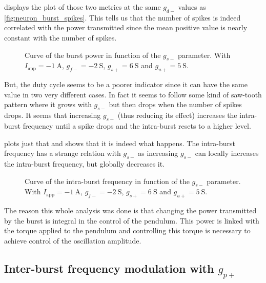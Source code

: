  displays the plot of those two metrics at the same $g_{d-}$ values as \cref{fig:neuron_burst_spikes}.
This tells us that the number of spikes is indeed correlated with the power transmitted since the mean positive value is nearly constant with the number of spikes. 

\begin{figure}[!htb]
    \centering
    \caption{Curve of the burst power in function of the $g_{s-}$ parameter. With $I_\text{app} = \qty{-1}{\ampere}$, $g_{f-} = \qty{-2}{\siemens}$, $g_{s+} = \qty{6}{\siemens}$ and $g_{u+} = \qty{5}{\siemens}$.}
    \label{fig:neuron_burst_power}
\end{figure}

But, the duty cycle seems to be a poorer indicator since it can have the same value in two very different cases.
In fact it seems to follow some kind of saw-tooth pattern where it grows with $g_{s-}$ but then drops when the number of spikes drops.
It seems that increasing $g_{s-}$ (thus reducing its effect) increases the intra-burst frequency until a spike drops and the intra-burst resets to a higher level.

 plots just that and shows that it is indeed what happens. 
The intra-burst frequency has a strange relation with $g_{s-}$ as increasing $g_{s-}$ can locally increases the intra-burst frequency, but globally decreases it.

\begin{figure}[!htb]
    \centering
    \caption{Curve of the intra-burst frequency in function of the $g_{s-}$ parameter. With $I_\text{app} = \qty{-1}{\ampere}$, $g_{f-} = \qty{-2}{\siemens}$, $g_{s+} = \qty{6}{\siemens}$ and $g_{u+} = \qty{5}{\siemens}$.}
    \label{fig:neuron_burst_intra}
\end{figure}

The reason this whole analysis was done is that changing the power transmitted by the burst is integral in the control of the pendulum.
This power is linked with the torque applied to the pendulum and controlling this torque is necessary to achieve control of the oscillation amplitude.

\subsection{Inter-burst frequency modulation with $g_{p+}$}


